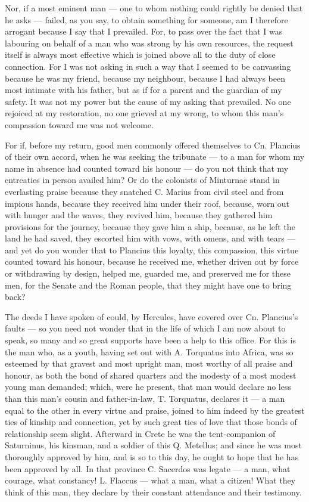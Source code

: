  Nor, if a most eminent man --- one to whom nothing could rightly be denied that he asks --- failed, as you say, to obtain something for someone, am I therefore arrogant because I say that I prevailed. For, to pass over the fact that I was labouring on behalf of a man who was strong by his own resources, the request itself is always most effective which is joined above all to the duty of close connection. For I was not asking in such a way that I seemed to be canvassing because he was my friend, because my neighbour, because I had always been most intimate with his father, but as if for a parent and the guardian of my safety. It was not my power but the cause of my asking that prevailed. No one rejoiced at my restoration, no one grieved at my wrong, to whom this man's compassion toward me was not welcome.

 For if, before my return, good men commonly offered themselves to Cn. Plancius of their own accord, when he was seeking the tribunate --- to a man for whom my name in absence had counted toward his honour --- do you not think that my entreaties in person availed him? Or do the colonists of Minturnae stand in everlasting praise because they snatched C. Marius from civil steel and from impious hands, because they received him under their roof, because, worn out with hunger and the waves, they revived him, because they gathered him provisions for the journey, because they gave him a ship, because, as he left the land he had saved, they escorted him with vows, with omens, and with tears --- and yet do you wonder that to Plancius this loyalty, this compassion, this virtue counted toward his honour, because he received me, whether driven out by force or withdrawing by design, helped me, guarded me, and preserved me for these men, for the Senate and the Roman people, that they might have one to bring back?

 The deeds I have spoken of could, by Hercules, have covered over Cn. Plancius's faults --- so you need not wonder that in the life of which I am now about to speak, so many and so great supports have been a help to this office. For this is the man who, as a youth, having set out with A. Torquatus into Africa, was so esteemed by that gravest and most upright man, most worthy of all praise and honour, as both the bond of shared quarters and the modesty of a most modest young man demanded; which, were he present, that man would declare no less than this man's cousin and father-in-law, T. Torquatus, declares it --- a man equal to the other in every virtue and praise, joined to him indeed by the greatest ties of kinship and connection, yet by such great ties of love that those bonds of relationship seem slight. Afterward in Crete he was the tent-companion of Saturninus, his kinsman, and a soldier of this Q. Metellus; and since he was most thoroughly approved by him, and is so to this day, he ought to hope that he has been approved by all. In that province C. Sacerdos was legate --- a man, what courage, what constancy! L. Flaccus --- what a man, what a citizen! What they think of this man, they declare by their constant attendance and their testimony.

